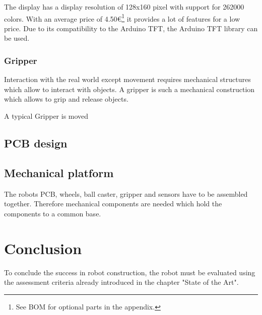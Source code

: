 \documentclass[11pt,a4paper]{article}
\begin{document}
The display has a display resolution of 128x160 pixel with support for 262000 colors. With an average price of 4.50\euro\footnote{See BOM for optional parts in the appendix.} it provides a lot of features for a low price. Due to its compatibility to the Arduino TFT, the Arduino TFT library can be used.

\subsubsection{Gripper}
Interaction with the real world except movement requires mechanical structures which allow to interact with objects. A gripper is such a mechanical construction which allows to grip and release objects.

A typical Gripper is moved 

\subsection{PCB design}

\subsection{Mechanical platform}
The robots PCB, wheels, ball caster, gripper and sensors have to be assembled together. Therefore mechanical components are needed which hold the components to a common base.




\section{Conclusion}
To conclude the success in robot construction, the robot must be evaluated using the assessment criteria already introduced in the chapter "State of the Art". 
\end{document}
